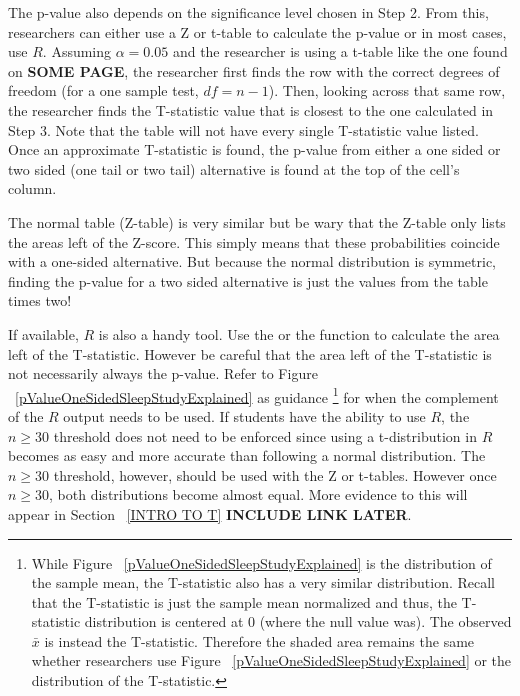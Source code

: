 The p-value also depends on the significance level chosen in Step 2. From this, researchers can either use a Z or t-table to calculate the p-value or in most cases, use $R$. Assuming $\alpha = 0.05$ and the researcher is using a t-table like the one found on \textbf{SOME PAGE}, the researcher first finds the row with the correct degrees of freedom (for a one sample test, $df = n-1$). Then, looking across that same row, the researcher finds the T-statistic value that is closest to the one calculated in Step 3. Note that the table will not have every single T-statistic value listed. Once an approximate T-statistic is found, the p-value from either a one sided or two sided (one tail or two tail) alternative is found at the top of the cell's column.
 
The normal table (Z-table) is very similar but be wary that the Z-table only lists the areas left of the Z-score. This simply means that these probabilities coincide with a one-sided alternative. But because the normal distribution is symmetric, finding the p-value for a two sided alternative is just the values from the table times two! 

If available, $R$ is also a handy tool. Use the  or the  function to calculate the area left of the T-statistic. However be careful that the area left of the T-statistic is not necessarily always the p-value. Refer to Figure ~\ref{pValueOneSidedSleepStudyExplained} as guidance \footnote{While Figure ~\ref{pValueOneSidedSleepStudyExplained} is the distribution of the sample mean, the T-statistic also has a very similar distribution. Recall that the T-statistic is just the sample mean normalized and thus, the T-statistic distribution is centered at 0 (where the null value was). The observed $\bar{x}$ is instead the T-statistic. Therefore the shaded area remains the same whether researchers use Figure ~\ref{pValueOneSidedSleepStudyExplained} or the distribution of the T-statistic.} for when the complement of the $R$ output needs to be used. If students have the ability to use $R$, the $n\geq 30$ threshold does not need to be enforced since using a t-distribution in $R$ becomes as easy and more accurate than following a normal distribution. The $n\geq 30$ threshold, however, should be used with the Z or t-tables. However once $n\geq 30$, both distributions become almost equal. More evidence to this will appear in Section ~\ref{INTRO TO T} \textbf{INCLUDE LINK LATER}.  

